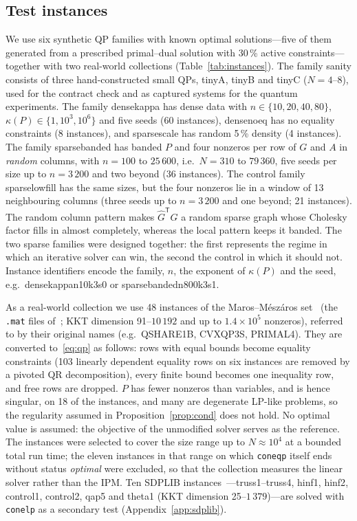 \documentclass[11pt]{article}
\theoremstyle{definition}
\newcommand{\Ghat}{\hat G}
\newcommand{\T}{^{\mathsf T}}
\newcommand{\dsus}{\textunderscore\penalty5000\hskip0pt\relax}
\newcommand{\ds}[1]{{\ttfamily\let\_\dsus#1}}
\begin{document}
\subsection{Test instances}
We use six synthetic QP families with known optimal solutions---five of them generated from a prescribed primal--dual solution with 30\,\% active constraints---together with two real-world collections (Table~\ref{tab:instances}). The family \ds{sanity} consists of three hand-constructed small QPs, \ds{tiny\_A}, \ds{tiny\_B} and \ds{tiny\_C} ($N=4$--$8$), used for the contract check and as captured systems for the quantum experiments. The family \ds{dense\_kappa} has dense data with $n\in\{10,20,40,80\}$, $\kappa(P)\in\{1,10^3,10^6\}$ and five seeds (60 instances), \ds{dense\_noeq} has no equality constraints (8 instances), and \ds{sparse\_scale} has random 5\,\% density (4 instances). The family \ds{sparse\_banded} has banded $P$ and four nonzeros per row of $G$ and $A$ in \emph{random} columns, with $n=100$ to $25\,600$, i.e.\ $N=310$ to $79\,360$, five seeds per size up to $n=3\,200$ and two beyond (36 instances). The control family \ds{sparse\_lowfill} has the same sizes, but the four nonzeros lie in a window of 13 neighbouring columns (three seeds up to $n=3\,200$ and one beyond; 21 instances). The random column pattern makes $\Ghat\T\Ghat$ a random sparse graph whose Cholesky factor fills in almost completely, whereas the local pattern keeps it banded. The two sparse families were designed together: the first represents the regime in which an iterative solver can win, the second the control in which it should not. Instance identifiers encode the family, $n$, the exponent of $\kappa(P)$ and the seed, e.g.\ \ds{dense\_kappa\_n10\_k3\_s0} or \ds{sparse\_banded\_n800\_k3\_s1}.

As a real-world collection we use 48 instances of the Maros--M\'esz\'aros set~\cite{maros1999repository} (the \texttt{.mat} files of~\cite{caron2024mmdata}; KKT dimension 91--$10\,192$ and up to $1.4\times10^{5}$ nonzeros), referred to by their original names (e.g.\ \ds{QSHARE1B}, \ds{CVXQP3\_S}, \ds{PRIMAL4}). They are converted to~\eqref{eq:qp} as follows: rows with equal bounds become equality constraints (103 linearly dependent equality rows on six instances are removed by a pivoted QR decomposition), every finite bound becomes one inequality row, and free rows are dropped. $P$ has fewer nonzeros than variables, and is hence singular, on 18 of the instances, and many are degenerate LP-like problems, so the regularity assumed in Proposition~\ref{prop:cond} does not hold. No optimal value is assumed: the objective of the unmodified solver serves as the reference. The instances were selected to cover the size range up to $N\approx10^{4}$ at a bounded total run time; the eleven instances in that range on which \texttt{coneqp} itself ends without status \emph{optimal} were excluded, so that the collection measures the linear solver rather than the IPM. Ten SDPLIB instances~\cite{borchers1999sdplib}---\ds{truss1}--\ds{truss4}, \ds{hinf1}, \ds{hinf2}, \ds{control1}, \ds{control2}, \ds{qap5} and \ds{theta1} (KKT dimension 25--$1\,379$)---are solved with \texttt{conelp} as a secondary test (Appendix~\ref{app:sdplib}).
\end{document}
